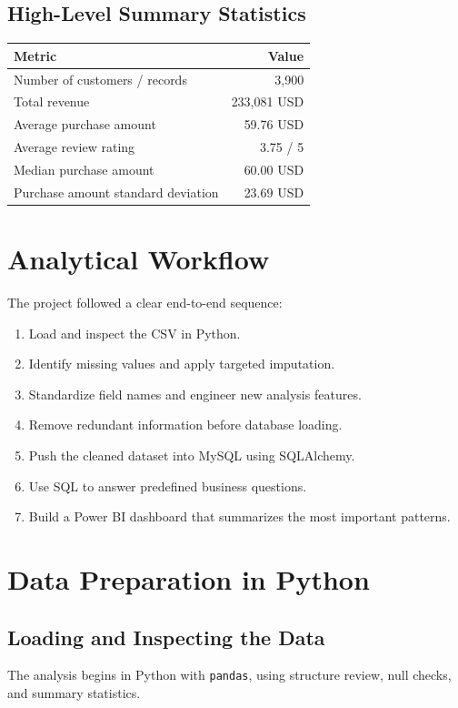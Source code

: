 \documentclass[12pt,a4paper]{article}
\begin{document}
\subsection{High-Level Summary Statistics}
\begin{center}
\begin{tabular}{lr}
\toprule
\textbf{Metric} & \textbf{Value} \\
\midrule
Number of customers / records & 3,900 \\
Total revenue & 233,081 USD \\
Average purchase amount & 59.76 USD \\
Average review rating & 3.75 / 5 \\
Median purchase amount & 60.00 USD \\
Purchase amount standard deviation & 23.69 USD \\
\bottomrule
\end{tabular}
\end{center}

\section{Analytical Workflow}
The project followed a clear end-to-end sequence:
\begin{enumerate}
  \item Load and inspect the CSV in Python.
  \item Identify missing values and apply targeted imputation.
  \item Standardize field names and engineer new analysis features.
  \item Remove redundant information before database loading.
  \item Push the cleaned dataset into MySQL using SQLAlchemy.
  \item Use SQL to answer predefined business questions.
  \item Build a Power BI dashboard that summarizes the most important patterns.
\end{enumerate}

\section{Data Preparation in Python}
\subsection{Loading and Inspecting the Data}
The analysis begins in Python with \texttt{pandas}, using structure review, null checks, and summary statistics.
\end{document}
